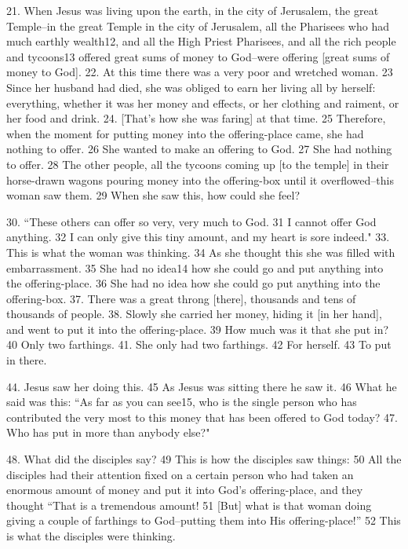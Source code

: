 \setcounter{footnote}{0}

21. When Jesus was living upon the earth, in the city of Jerusalem, the great Temple--in
the great Temple in the city of Jerusalem, all the Pharisees who had much earthly
wealth12, and all the High Priest Pharisees, and all the rich people and tycoons13
offered great sums of money to God--were offering [great sums of money to God].
22. At this time there was a very poor and wretched woman. 23 Since her husband
had died, she was obliged to earn her living all by herself: everything, whether
it was her money and effects, or her clothing and raiment, or her food and drink.
24. [That's how she was faring] at that time. 25 Therefore, when the moment for
putting money into the offering-place came, she had nothing to offer. 26 She wanted
to make an offering to God. 27 She had nothing to offer. 28 The other people, all
the tycoons coming up [to the temple] in their horse-drawn wagons pouring money
into the offering-box until it overflowed--this woman saw them. 29 When she saw
this, how could she feel?

30. ``These others can offer so very, very much to God. 31 I cannot offer
God anything. 32 I can only give this tiny amount, and my heart is sore indeed."
33. This is what the woman was thinking. 34 As she thought this she was filled with
embarrassment. 35 She had no idea14 how she could go and put anything into the
offering-place. 36 She had no idea how she could go put anything into the offering-box.
37. There was a great throng [there], thousands and tens of thousands of people.
38. Slowly she carried her money, hiding it [in her hand], and went to put it into
the offering-place. 39 How much was it that she put in? 40 Only two farthings.
41. She only had two farthings. 42 For herself. 43 To put in there.

44. Jesus saw her doing this. 45 As Jesus was sitting there he saw it. 46 What he
said was this: ``As far as you can see15, who is the single person who
has contributed the very most to this money that has been offered to God today?
47. Who has put in more than anybody else?"

48. What did the disciples say? 49 This is how the disciples saw things: 50 All
the disciples had their attention fixed on a certain person who had taken an enormous
amount of money and put it into God's offering-place, and they thought ``That
is a tremendous amount! 51 [But] what is that woman doing giving a couple of farthings
to God--putting them into His offering-place!'' 52 This is what the disciples
were thinking.

